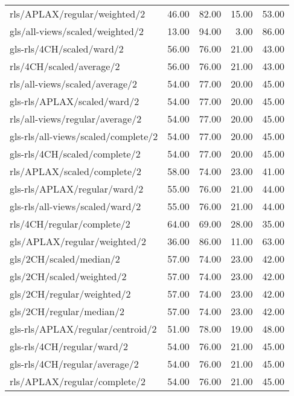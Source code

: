 \begin{longtable}{lrrrr}
    rls/APLAX/regular/weighted/2              & 46.00 & 82.00 & 15.00 & 53.00 \\
    gls/all-views/scaled/weighted/2           & 13.00 & 94.00 &  3.00 & 86.00 \\
    gls-rls/4CH/scaled/ward/2                 & 56.00 & 76.00 & 21.00 & 43.00 \\
    rls/4CH/scaled/average/2                  & 56.00 & 76.00 & 21.00 & 43.00 \\
    rls/all-views/scaled/average/2            & 54.00 & 77.00 & 20.00 & 45.00 \\
    gls-rls/APLAX/scaled/ward/2               & 54.00 & 77.00 & 20.00 & 45.00 \\
    rls/all-views/regular/average/2           & 54.00 & 77.00 & 20.00 & 45.00 \\
    gls-rls/all-views/scaled/complete/2       & 54.00 & 77.00 & 20.00 & 45.00 \\
    gls-rls/4CH/scaled/complete/2             & 54.00 & 77.00 & 20.00 & 45.00 \\
    rls/APLAX/scaled/complete/2               & 58.00 & 74.00 & 23.00 & 41.00 \\
    gls-rls/APLAX/regular/ward/2              & 55.00 & 76.00 & 21.00 & 44.00 \\
    gls-rls/all-views/scaled/ward/2           & 55.00 & 76.00 & 21.00 & 44.00 \\
    rls/4CH/regular/complete/2                & 64.00 & 69.00 & 28.00 & 35.00 \\
    gls/APLAX/regular/weighted/2              & 36.00 & 86.00 & 11.00 & 63.00 \\
    gls/2CH/scaled/median/2                   & 57.00 & 74.00 & 23.00 & 42.00 \\
    gls/2CH/scaled/weighted/2                 & 57.00 & 74.00 & 23.00 & 42.00 \\
    gls/2CH/regular/weighted/2                & 57.00 & 74.00 & 23.00 & 42.00 \\
    gls/2CH/regular/median/2                  & 57.00 & 74.00 & 23.00 & 42.00 \\
    gls-rls/APLAX/regular/centroid/2          & 51.00 & 78.00 & 19.00 & 48.00 \\
    gls-rls/4CH/regular/ward/2                & 54.00 & 76.00 & 21.00 & 45.00 \\
    gls-rls/4CH/regular/average/2             & 54.00 & 76.00 & 21.00 & 45.00 \\
    rls/APLAX/regular/complete/2              & 54.00 & 76.00 & 21.00 & 45.00 \\

\end{longtable}
